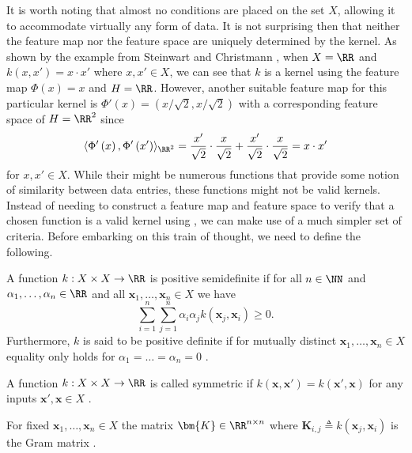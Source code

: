 It is worth noting that almost no conditions are placed on the set $X$, allowing it to accommodate virtually any form of data. It is not surprising then that neither the feature map nor the feature space are uniquely determined by the kernel. As shown by the example from Steinwart and Christmann \cite{SteinwartIngo2008SVMb}, when $X = \RR$ and $k \left( x , x' \right) = x \cdot x'$ where $x , x' \in X$, we can see that $k$ is a kernel using the feature map $\Phi \left( x \right) = x$ and $H = \RR$. However, another suitable feature map for this particular kernel is $\Phi' \left( x \right) = \left( x / \sqrt{2} , x / \sqrt{2} \right)$ with a corresponding feature space of $H = \RR^2$ since
\[
    \langle \Phi' \left( x \right), \Phi' \left( x' \right) \rangle_{\RR^2} = \frac{x'}{\sqrt{2}} \cdot \frac{x}{\sqrt{2}} + \frac{x'}{\sqrt{2}} \cdot \frac{x}{\sqrt{2}} = x \cdot x'
\]
for $x,x' \in X$. While their might be numerous functions that provide some notion of similarity between data entries, these functions might not be valid kernels. Instead of needing to construct a feature map and feature space to verify that a chosen function is a valid kernel using , we can make use of a much simpler set of criteria. Before embarking on this train of thought, we need to define the following.

\begin{defe} \label{defe: PD}
    A function $k : X \times X \to \RR$ is positive semidefinite if for all $n \in \NN$ and $\alpha_1 , \ldots , \alpha_n \in \RR$ and all $\bm{x}_1 ,\ldots , \bm{x}_n \in X$ we have
    \begin{equation}\label{eq: PSD}
        \sum_{i=1}^{n} \sum_{j=1}^{n} \alpha_i \alpha_j k \left( \bm{x}_j , \bm{x}_i \right) \geq 0.
    \end{equation}
    Furthermore, $k$ is said to be positive definite if for mutually distinct $\bm{x}_1 ,\ldots , \bm{x}_n \in X$ equality  only holds for $\alpha_1 = \ldots = \alpha_n = 0$ \cite{SteinwartIngo2008SVMb}.
\end{defe}

\begin{defe}[Symmetric] \label{defe: Symmetric_function}
    A function $k : X \times X \to \RR$ is called symmetric if $k \left( \bm{x} , \bm{x}' \right) = k \left( \bm{x}' , \bm{x} \right)$ for any inputs $\bm{x}' , \bm{x} \in X$ \cite{SteinwartIngo2008SVMb}.
\end{defe}

\begin{defe} \label{defe: Gram_Matrix}
    For fixed $\bm{x}_1 ,\ldots , \bm{x}_n \in X$ the matrix $\bm{K} \in \RR^{n \times n}$ where $\bm{K}_{i,j} \triangleq k \left( \bm{x}_j , \bm{x}_i \right)$ is the Gram matrix \cite{SteinwartIngo2008SVMb}.
\end{defe}


